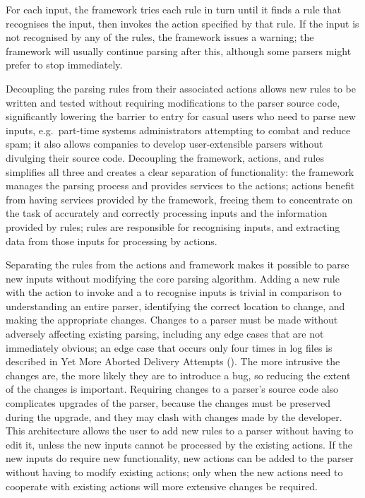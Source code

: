 For each input, the framework tries each rule in turn until it finds a rule
that recognises the input, then invokes the action specified by that rule.
If the input is not recognised by any of the rules, the framework issues a
warning; the framework will usually continue parsing after this, although
some parsers might prefer to stop immediately.

Decoupling the parsing rules from their associated actions allows new rules
to be written and tested without requiring modifications to the parser
source code, significantly lowering the barrier to entry for casual users
who need to parse new inputs, e.g.\ part-time systems administrators
attempting to combat and reduce spam; it also allows companies to develop
user-extensible parsers without divulging their source code.  Decoupling
the framework, actions, and rules simplifies all three and creates a clear
separation of functionality: the framework manages the parsing process and
provides services to the actions; actions benefit from having services
provided by the framework, freeing them to concentrate on the task of
accurately and correctly processing inputs and the information provided by
rules; rules are responsible for recognising inputs, and extracting data
from those inputs for processing by actions.

Separating the rules from the actions and framework makes it possible to
parse new inputs without modifying the core parsing algorithm.  Adding a
new rule with the action to invoke and a  to recognise
inputs is trivial in comparison to understanding an entire parser,
identifying the correct location to change, and making the appropriate
changes.  Changes to a parser must be made without adversely affecting
existing parsing, including any edge cases that are not immediately
obvious; an edge case that occurs only four times in \numberOFlogFILES{}
log files is described in Yet More Aborted Delivery Attempts
().  The more intrusive the
changes are, the more likely they are to introduce a bug, so reducing the
extent of the changes is important.  Requiring changes to a parser's source
code also complicates upgrades of the parser, because the changes must be
preserved during the upgrade, and they may clash with changes made by the
developer.  This architecture allows the user to add new rules to a parser
without having to edit it, unless the new inputs cannot be processed by the
existing actions.  If the new inputs do require new functionality, new
actions can be added to the parser without having to modify existing
actions; only when the new actions need to cooperate with existing actions
will more extensive changes be required.

